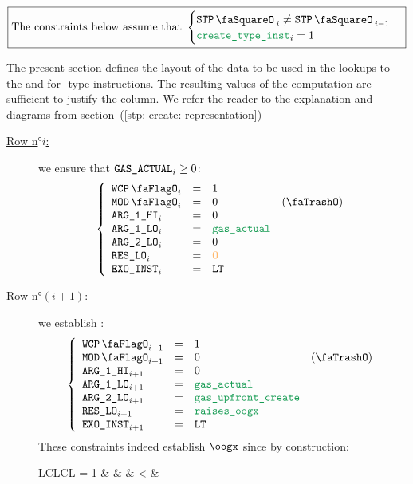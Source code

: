 \[
	\boxed{\text{The constraints below assume that }
	\begin{cases}
		\stpStamp_{i} \neq \stpStamp_{i - 1} \\
		\isCreate_{i} =    1                 \\
	\end{cases} }
\]

The present section defines the layout of the data to be used in the lookups to the \wcpMod{} and \modMod{} for -type instructions. The resulting values of the computation are sufficient to justify the \gasStipend{} column. We refer the reader to the explanation and diagrams from section~(\ref{stp: create: representation})
\begin{description}
	\item[\underline{Row n$°i$:}] we ensure that $\texttt{GAS}\texttt{\_ACTUAL}_{i} \geq 0$:
		\[
			\left\{\begin{array}{lclc}
				\wcpLookupFlag_{i} & = & 1 \\
				\divLookupFlag_{i} & = & 0 & (\trash) \\
				\argOneHi_{i}      & = & 0 \\
				\argOneLo_{i}      & = & \locGasActl \\
				\argTwoLo_{i}      & = & 0 \\
				\resLo_{i}         & = & \zeroRes \\
				\exoInst_{i}       & = & \inst{LT} \\
			\end{array}\right.
		\]
	\item[\underline{Row n$°(i + 1)$:}] we establish \oogx:
		\[
			\left\{\begin{array}{lclc}
				\wcpLookupFlag_{i + 1} & = & 1 \\
				\divLookupFlag_{i + 1} & = & 0 & (\trash) \\
				\argOneHi_{i + 1}      & = & 0 \\
				\argOneLo_{i + 1}      & = & \locGasActl \\
				\argTwoLo_{i + 1}      & = & \locGasUpfrontCreate \\
				\resLo_{i + 1}         & = & \locOogx \\
				\exoInst_{i + 1}       & = & \inst{LT} \\
			\end{array}\right.
		\]
		\saNote{} These constraints indeed establish $\oogx$ since by construction:
		\begin{IEEEeqnarray*}{LCLCL}
			\locOogx = 1
			& \iff & \locGasActl    & < & \locGasUpfrontCreate            \\
		\end{IEEEeqnarray*}
\end{description}
